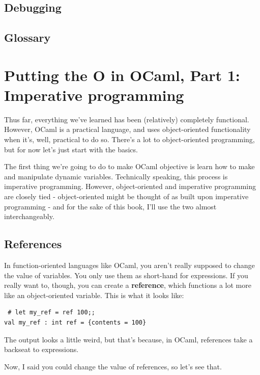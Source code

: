 \documentclass[10pt]{book}
\begin{document}
{\section{Debugging}

\section{Glossary}


\chapter{Putting the O in OCaml, Part 1: Imperative programming}

Thus far, everything we've learned has been (relatively) completely functional.
However, OCaml is a practical language, and uses object-oriented functionality 
when it's, well, practical to do so. There's a lot to object-oriented programming,
but for now let's just start with the basics.

The first thing we're going to do to make OCaml objective is learn how to make 
and manipulate dynamic variables. Technically speaking, this process is imperative 
programming. However, object-oriented and imperative programming are closely tied - 
object-oriented might be thought of as built upon imperative programming - and for 
the sake of this book, I'll use the two almost interchangeably.

\section{References}


In function-oriented languages like OCaml, you 
aren't really supposed to change the value of 
variables. You only use them as short-hand for 
expressions. If you really want to, though, you 
can create a {\bf reference}, which functions
a lot more like an object-oriented variable. 
This is what it looks like:

\beforeverb
\begin{verbatim}
 # let my_ref = ref 100;;
val my_ref : int ref = {contents = 100}
\end{verbatim}
\afterverb

The output looks a little weird, but that's because, 
in OCaml, references take a backseat to expressions.

Now, I said you could change the value of references, 
so let's see that.

}
\end{document}
